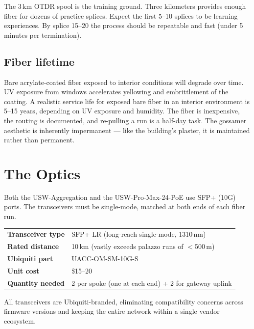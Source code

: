 \documentclass[]{anvil-proposal}
\begin{document}
The 3\,km OTDR spool is the training ground. Three kilometers provides enough fiber for dozens of practice splices. Expect the first 5--10 splices to be learning experiences. By splice 15--20 the process should be repeatable and fast (under 5 minutes per termination).

\subsection{Fiber lifetime}

Bare acrylate-coated fiber exposed to interior conditions will degrade over time. UV exposure from windows accelerates yellowing and embrittlement of the coating. A realistic service life for exposed bare fiber in an interior environment is 5--15 years, depending on UV exposure and humidity. The fiber is inexpensive, the routing is documented, and re-pulling a run is a half-day task. The gossamer aesthetic is inherently impermanent --- like the building's plaster, it is maintained rather than permanent.

\section{The Optics}

Both the USW-Aggregation and the USW-Pro-Max-24-PoE use SFP+ (10G) ports. The transceivers must be single-mode, matched at both ends of each fiber run.

\begin{metricbox}
\begin{tabularx}{\textwidth}{@{} >{\bfseries}l X @{}}
Transceiver type & SFP+ LR (long-reach single-mode, 1310\,nm) \\
Rated distance & 10\,km (vastly exceeds palazzo runs of $<$500\,m) \\
Ubiquiti part & UACC-OM-SM-10G-S \\
Unit cost & \$15--20 \\
Quantity needed & 2 per spoke (one at each end) + 2 for gateway uplink \\
\end{tabularx}
\end{metricbox}

All transceivers are Ubiquiti-branded, eliminating compatibility concerns across firmware versions and keeping the entire network within a single vendor ecosystem.

\end{document}
